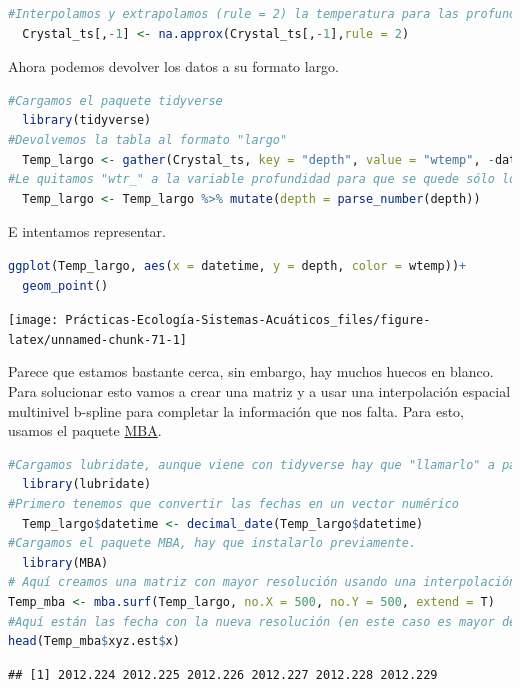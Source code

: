 \documentclass[
]{book}
\begin{document}
\begin{lstlisting}[language=R]
#Interpolamos y extrapolamos (rule = 2) la temperatura para las profundidades que nos faltan.
  Crystal_ts[,-1] <- na.approx(Crystal_ts[,-1],rule = 2)
\end{lstlisting}

Ahora podemos devolver los datos a su formato largo.

\begin{lstlisting}[language=R]
#Cargamos el paquete tidyverse
  library(tidyverse)
#Devolvemos la tabla al formato "largo"
  Temp_largo <- gather(Crystal_ts, key = "depth", value = "wtemp", -datetime)
#Le quitamos "wtr_" a la variable profundidad para que se quede sólo los números.
  Temp_largo <- Temp_largo %>% mutate(depth = parse_number(depth))
\end{lstlisting}

E intentamos representar.

\begin{lstlisting}[language=R]
ggplot(Temp_largo, aes(x = datetime, y = depth, color = wtemp))+
  geom_point()
\end{lstlisting}

\texttt{[image: Prácticas-Ecología-Sistemas-Acuáticos\_files/figure-latex/unnamed-chunk-71-1]}

Parece que estamos bastante cerca, sin embargo, hay muchos huecos en blanco. Para solucionar esto vamos a crear una matriz y a usar una interpolación espacial multinivel b-spline para completar la información que nos falta. Para esto, usamos el paquete \href{https://cran.r-project.org/web/packages/MBA/MBA.pdf}{MBA}.

\begin{lstlisting}[language=R]
#Cargamos lubridate, aunque viene con tidyverse hay que "llamarlo" a parte.
  library(lubridate)
#Primero tenemos que convertir las fechas en un vector numérico
  Temp_largo$datetime <- decimal_date(Temp_largo$datetime)
#Cargamos el paquete MBA, hay que instalarlo previamente.
  library(MBA)
# Aquí creamos una matriz con mayor resolución usando una interpolación espacial multinivel b-spline
Temp_mba <- mba.surf(Temp_largo, no.X = 500, no.Y = 500, extend = T)
#Aquí están las fecha con la nueva resolución (en este caso es mayor de la que teniamos, 500 "perfiles", frente a los 189 que teníamos)
head(Temp_mba$xyz.est$x)
\end{lstlisting}

\begin{lstlisting}
## [1] 2012.224 2012.225 2012.226 2012.227 2012.228 2012.229
\end{lstlisting}
\end{document}
